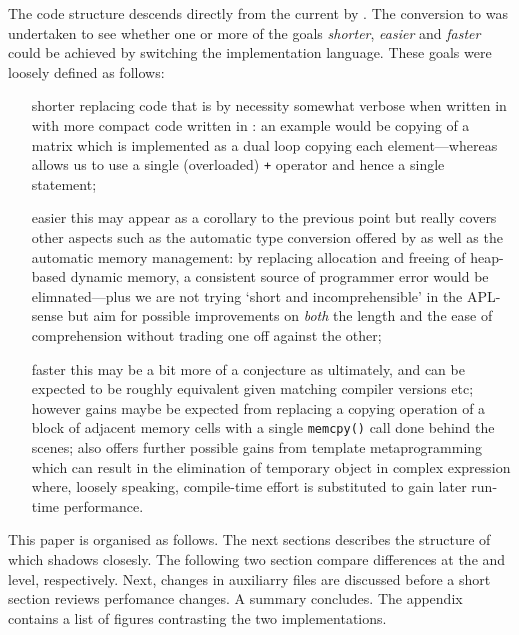 \documentclass[nojss,shortnames,article]{jss}
\begin{document}
The code structure descends directly from the current  by
\cite{CRAN:DEoptim}.  The conversion to  was undertaken to see
whether one or more of the goals \textsl{shorter}, \textsl{easier}  and
\textsl{faster} could be achieved by switching the implementation
language. These goals were loosely defined as follows:
\begin{itemize}
\item[shorter] replacing code that is by necessity somewhat verbose when
  written in  with more compact code written in :
  an example would be copying of a matrix which is implemented as a dual loop
  copying each element---whereas  allows us to use a single
  (overloaded) \verb|+| operator and hence a single statement;
\item[easier] this may appear as a corollary to the previous point but really
  covers other aspects such as the automatic type conversion offered by
   as well as the automatic memory management: by replacing
  allocation and freeing of heap-based dynamic memory, a consistent source of
  programmer error would be elimnated---plus we are not trying `short and
  incomprehensible' in the APL-sense but aim for possible improvements on
  \textsl{both} the length and the ease of comprehension without trading one
  off against the other;
\item[faster] this may be a bit more of a conjecture as ultimately,
   and  can be expected to be roughly equivalent
  given matching compiler versions etc; however gains maybe be expected from
  replacing a copying operation of a block of adjacent memory cells with a
  single \verb|memcpy()| call done behind the scenes; 
  also offers further possible gains from template metaprogramming which can
  result in the elimination of temporary object in complex expression where,
  loosely speaking, compile-time effort is substituted to gain later run-time
  performance. 
\end{itemize}

This paper is organised as follows. The next sections describes the structure
of  which  shadows closesly. The following two
section compare differences at the  and  level,
respectively. Next, changes in auxiliarry files are discussed before a
short section reviews perfomance changes. A summary concludes. The
appendix contains a list of figures contrasting the two implementations.
\end{document}
